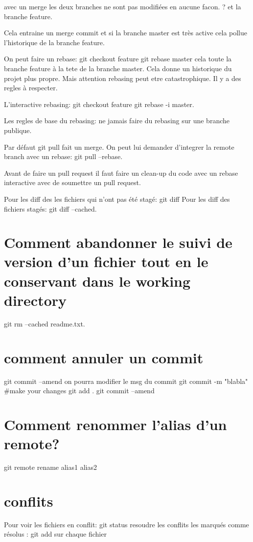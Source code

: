 \documentclass[12pt,a4paper]{article}
\begin{document}
avec un merge les deux branches ne sont pas modifiées en aucune facon. ? et la branche feature.

Cela entraine un merge commit et si la branche master est très active cela pollue l'historique de la branche feature.

On peut faire un rebase:
git checkout feature
git rebase master
cela toute la branche feature à la tete de la branche master. Cela donne un historique du projet plus propre. Mais attention rebasing peut etre catastrophique. Il y a des regles à respecter.

L'interactive rebasing:
git checkout feature
git rebase -i master.

Les regles de base du rebasing: ne jamais faire du rebasing sur une branche publique.

Par défaut git pull fait un merge. On peut lui demander d'integrer la remote branch avec un rebase: git pull --rebase.

Avant de faire un pull request il faut faire un clean-up du code avec un rebase interactive avec de soumettre un pull request.

Pour les diff des les fichiers qui n'ont pas été stagé: git diff
Pour les diff des fichiers stagés: git diff --cached.

\section{Comment abandonner le suivi de version d'un fichier tout en le conservant dans le working directory}
git rm --cached readme.txt.

\section{comment annuler un commit}
git commit --amend on pourra modifier le msg du commit
git commit -m "blabla"
#make your changes
git add .
git commit --amend

\section{Comment renommer l'alias d'un remote?}
git remote rename alias1 alias2


\section{conflits}
Pour voir les fichiers en conflit: git status
resoudre les conflits
les marqués comme résolus : git add  sur chaque fichier
\end{document}
